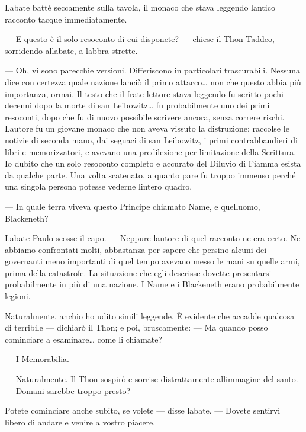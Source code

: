 L\textquotesingle abate batté seccamente sulla tavola, il monaco che
stava leggendo l\textquotesingle antico racconto tacque immediatamente.

--- E questo è il solo resoconto di cui disponete? --- chiese il Thon
Taddeo, sorridendo all\textquotesingle abate, a labbra strette.

--- Oh, vi sono parecchie versioni. Differiscono in particolari
trascurabili. Nessuna dice con certezza quale nazione lanciò il primo
attacco\ldots{} non che questo abbia più importanza, ormai. Il testo che
il frate lettore stava leggendo fu scritto pochi decenni dopo la morte
di san Leibowitz\ldots{} fu probabilmente uno dei primi resoconti, dopo
che fu di nuovo possibile scrivere ancora, senza correre rischi.
L\textquotesingle autore fu un giovane monaco che non aveva vissuto la
distruzione: raccolse le notizie di seconda mano, dai seguaci di san
Leibowitz, i primi contrabbandieri di libri e memorizzatori, e avevano
una predilezione per l\textquotesingle imitazione della Scrittura. Io
dubito che un solo resoconto completo e accurato del Diluvio di Fiamma
esista da qualche parte. Una volta scatenato, a quanto pare fu troppo
immenso perché una singola persona potesse vederne
l\textquotesingle intero quadro.

--- In quale terra viveva questo Principe chiamato Name, e
quell\textquotesingle uomo, Blackeneth?

L\textquotesingle abate Paulo scosse il capo. --- Neppure
l\textquotesingle autore di quel racconto ne era certo. Ne abbiamo
confrontati molti, abbastanza per sapere che persino alcuni dei
governanti meno importanti di quel tempo avevano messo le mani su quelle
armi, prima della catastrofe. La situazione che egli descrisse dovette
presentarsi probabilmente in più di una nazione. I Name e i Blackeneth
erano probabilmente legioni.

Naturalmente, anch\textquotesingle io ho udito simili leggende. È
evidente che accadde qualcosa di terribile --- dichiarò il Thon; e poi,
bruscamente: --- Ma quando posso cominciare a esaminare\ldots{} come li
chiamate?

--- I Memorabilia.

--- Naturalmente. Il Thon sospirò e sorrise distrattamente
all\textquotesingle immagine del santo. --- Domani sarebbe troppo
presto?

Potete cominciare anche subito, se volete --- disse
l\textquotesingle abate. --- Dovete sentirvi libero di andare e venire a
vostro piacere.

